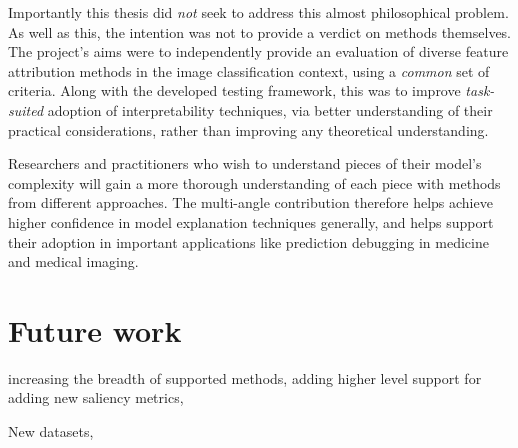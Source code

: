 \documentclass[main]{subfiles}
\begin{document}
Importantly this thesis did \textit{not} seek to address this almost philosophical problem. As well as this, the intention was not to provide a verdict on methods themselves. The project's aims were to independently provide an evaluation of diverse feature attribution methods in the image classification context, using a \textit{common} set of criteria. Along with the developed testing framework, this was to improve \textit{task-suited} adoption of interpretability techniques, via better understanding of their practical considerations, rather than improving any theoretical understanding.

Researchers and practitioners who wish to understand pieces of their model's complexity will gain a more thorough understanding of each piece with methods from different approaches. The multi-angle contribution therefore helps achieve higher confidence in model explanation techniques generally, and helps support their adoption in important applications like prediction debugging in medicine and medical imaging.

\section{Future work}

increasing the breadth of supported methods, adding higher level support for adding new saliency metrics, 

New datasets, 
\end{document}
